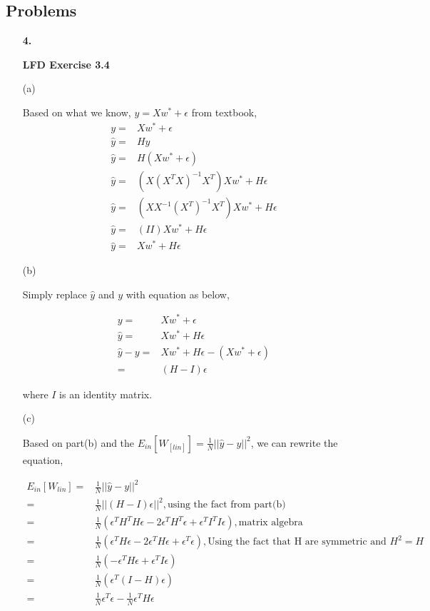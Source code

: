 \documentclass[11pt]{article}
\begin{document}
\subsection*{Problems}
\begin{enumerate}

\item[\textbf{4.}]

\textbf{LFD Exercise 3.4}

(a)

Based on what we know, $y = Xw^{\ast}+ \epsilon$ from textbook,
\begin{equation}
\begin{aligned}
y =& Xw^{\ast}+ \epsilon\\
\hat{y} =& Hy\\
\hat{y} =& H(Xw^{\ast}+ \epsilon)\\
\hat{y} =& (X(X^TX)^{-1}X^T)Xw^{\ast}+ H\epsilon\\
\hat{y} =&  (XX^{-1}(X^T)^{-1}X^T)Xw^{\ast}+ H\epsilon\\
\hat{y} =& (II)Xw^{\ast}+ H\epsilon\\
\hat{y} =& Xw^{\ast}+ H\epsilon
\end{aligned}
\end{equation}

(b)

Simply replace $\hat{y}$ and $y$ with equation as below, 

\begin{equation}
\begin{aligned}
y =& Xw^{\ast}+ \epsilon\\
\hat{y} =& Xw^{\ast}+ H\epsilon\\
\hat{y} - y =& Xw^{\ast}+ H\epsilon - (Xw^{\ast}+ \epsilon)\\
=& (H-I)\epsilon
\end{aligned}
\end{equation}

where $I$ is an identity matrix.

(c)

Based on part(b) and the $E_{in}[W_[lin]] = \frac{1}{N}||\hat{y} - y||^2$, we can rewrite the equation, 

\begin{equation}
\begin{aligned}
E_{in}[W_{lin}] =& \frac{1}{N}||\hat{y} - y||^2\\
=& \frac{1}{N} ||(H-I)\epsilon||^2, \text{using the fact from part(b)}\\
=& \frac{1}{N} (\epsilon^TH^TH\epsilon - 2\epsilon^TH^T\epsilon +\epsilon^TI^TI\epsilon), \text{matrix algebra}\\
=& \frac{1}{N} (\epsilon^TH\epsilon - 2\epsilon^TH\epsilon + \epsilon^T\epsilon), \text{Using the fact that H are symmetric and $H^2 = H$}\\
=& \frac{1}{N} (-\epsilon^TH\epsilon + \epsilon^TI\epsilon)\\
=& \frac{1}{N} (\epsilon^T(I-H)\epsilon)\\
=& \frac{1}{N}\epsilon^T\epsilon - \frac{1}{N}\epsilon^TH\epsilon 
\end{aligned}
\end{equation}




\end{enumerate}
\end{document}
